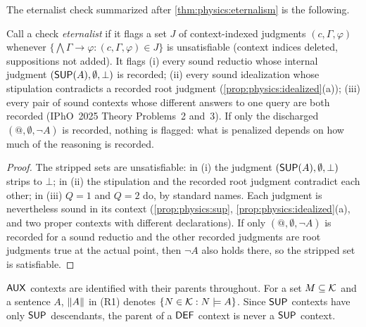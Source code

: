 The eternalist check summarized after \cref{thm:physics:eternalism} is the following.

\begin{corollary}\label{cor:physics:eternalist}
Call a check \emph{eternalist} if it flags a set $J$ of context-indexed judgments
$(c,\Gamma,\varphi)$ whenever $\{\bigwedge\Gamma\to\varphi:(c,\Gamma,\varphi)\in J\}$ is
unsatisfiable (context indices deleted, suppositions not added). It flags (i) every sound
reductio whose internal judgment $(\mathsf{SUP}(A),\emptyset,\bot)$ is recorded; (ii) every sound
idealization whose stipulation contradicts a recorded root judgment
(\cref{prop:physics:idealized}(a)); (iii) every pair of sound contexts whose different
answers to one query are both recorded (IPhO~2025 Theory Problems~2 and~3). If only the
discharged $(@,\emptyset,\neg A)$ is recorded, nothing is flagged: what is penalized
depends on how much of the reasoning is recorded.
\end{corollary}
\begin{proof}
The stripped sets are unsatisfiable: in (i) the judgment $(\mathsf{SUP}(A),\emptyset,\bot)$ strips to
$\bot$; in (ii) the stipulation and the recorded root judgment contradict each other; in (iii)
$Q=1$ and $Q=2$ do, by standard names. Each judgment is nevertheless sound in its context
(\cref{prop:physics:sup}, \cref{prop:physics:idealized}(a), and two proper contexts with
different declarations). If only $(@,\emptyset,\neg A)$ is recorded for a sound reductio and
the other recorded judgments are root judgments true at the actual point, then $\neg A$ also
holds there, so the stripped set is satisfiable.
\end{proof}


$\mathsf{AUX}$ contexts are identified with their parents throughout. For a set $M\subseteq\mathcal{K}$ and a
sentence $A$, $\lVert A\rVert$ in (R1) denotes $\{N\in\mathcal{K}:N\models A\}$. Since $\mathsf{SUP}$ contexts
have only $\mathsf{SUP}$ descendants, the parent of a $\mathsf{DEF}$ context is never a $\mathsf{SUP}$ context.

